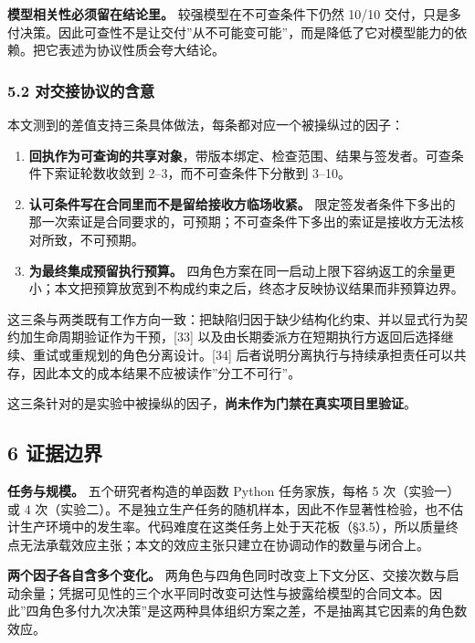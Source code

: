 \documentclass[
]{article}
\providecommand{\tightlist}{%
  \setlength{\itemsep}{0pt}\setlength{\parskip}{0pt}}
\begin{document}
\textbf{模型相关性必须留在结论里。} 较强模型在不可查条件下仍然 10/10
交付，只是多付决策。因此可查性不是让交付''从不可能变可能''，而是降低了它对模型能力的依赖。把它表述为协议性质会夸大结论。

\subsubsection{5.2
对交接协议的含意}\label{ux5bf9ux4ea4ux63a5ux534fux8baeux7684ux542bux610f}

本文测到的差值支持三条具体做法，每条都对应一个被操纵过的因子：

\begin{enumerate}
\def\labelenumi{\arabic{enumi}.}
\tightlist
\item
  \textbf{回执作为可查询的共享对象}，带版本绑定、检查范围、结果与签发者。可查条件下索证轮数收敛到
  2--3，而不可查条件下分散到 3--10。
\item
  \textbf{认可条件写在合同里而不是留给接收方临场收紧。}
  限定签发者条件下多出的那一次索证是合同要求的，可预期；不可查条件下多出的索证是接收方无法核对所致，不可预期。
\item
  \textbf{为最终集成预留执行预算。}
  四角色方案在同一启动上限下容纳返工的余量更小；本文把预算放宽到不构成约束之后，终态才反映协议结果而非预算边界。
\end{enumerate}

这三条与两类既有工作方向一致：把缺陷归因于缺少结构化约束、并以显式行为契约加生命周期验证作为干预，{[}33{]}
以及由长期委派方在短期执行方返回后选择继续、重试或重规划的角色分离设计。{[}34{]}
后者说明分离执行与持续承担责任可以共存，因此本文的成本结果不应被读作''分工不可行''。

这三条针对的是实验中被操纵的因子，\textbf{尚未作为门禁在真实项目里验证}。

\subsection{6 证据边界}\label{ux8bc1ux636eux8fb9ux754c}

\textbf{任务与规模。} 五个研究者构造的单函数 Python 任务家族，每格 5
次（实验一）或 4
次（实验二）。不是独立生产任务的随机样本，因此不作显著性检验，也不估计生产环境中的发生率。代码难度在这类任务上处于天花板（§3.5），所以质量终点无法承载效应主张；本文的效应主张只建立在协调动作的数量与闭合上。

\textbf{两个因子各自含多个变化。}
两角色与四角色同时改变上下文分区、交接次数与启动余量；凭据可见性的三个水平同时改变可达性与披露给模型的合同文本。因此''四角色多付九次决策''是这两种具体组织方案之差，不是抽离其它因素的角色数效应。
\end{document}
